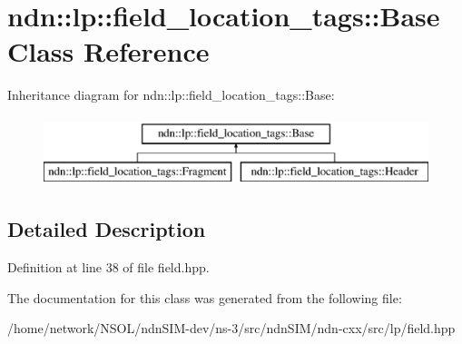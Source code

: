 \hypertarget{classndn_1_1lp_1_1field__location__tags_1_1Base}{}\section{ndn\+:\+:lp\+:\+:field\+\_\+location\+\_\+tags\+:\+:Base Class Reference}
\label{classndn_1_1lp_1_1field__location__tags_1_1Base}
Inheritance diagram for ndn\+:\+:lp\+:\+:field\+\_\+location\+\_\+tags\+:\+:Base\+:\begin{figure}[H]
\begin{center}
\leavevmode
\includegraphics[height=2.000000cm]{classndn_1_1lp_1_1field__location__tags_1_1Base}
\end{center}
\end{figure}


\subsection{Detailed Description}


Definition at line 38 of file field.\+hpp.



The documentation for this class was generated from the following file\+:\begin{DoxyCompactItemize}
\item 
/home/network/\+N\+S\+O\+L/ndn\+S\+I\+M-\/dev/ns-\/3/src/ndn\+S\+I\+M/ndn-\/cxx/src/lp/field.\+hpp\end{DoxyCompactItemize}
